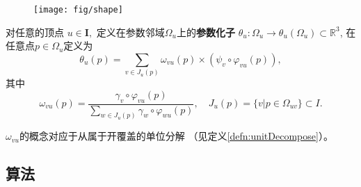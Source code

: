 \begin{figure}[H]
    \centering
    \texttt{[image: fig/shape]}
    \label{fig:shape}
  \end{figure}

\begin{defn}
  对任意的顶点 $u\in \mathbf{I},$
  定义在参数邻域$\Omega_u$上的\textbf{参数化子}
  $\theta_u:\Omega_u\rightarrow \theta_u(\Omega_u)\subset\mathbb{R}^3$,
  在任意点$p\in \Omega_u$定义为
  \begin{displaymath}
    \theta_u(p)=\sum_{v\in J_u(p)}\omega_{vu}(p)\times (\psi_v\circ
    \varphi_{vu}(p)),
  \end{displaymath}
其中
\begin{equation}
  \omega_{vu}(p)=\frac{\gamma_v\circ\varphi_{vu}(p)}
  {\sum_{w\in J_u(p)}\gamma_w\circ\varphi_{wu}(p)},\quad
  J_u(p)=\{v\vert p\in \Omega_{uv}\}\subset I.
\end{equation}
\end{defn}

\begin{rem}
  $\omega_{vu}$的概念对应于从属于开覆盖的单位分解
  （见定义\ref{defn:unitDecompose}）。
\end{rem}
\subsection{算法}



